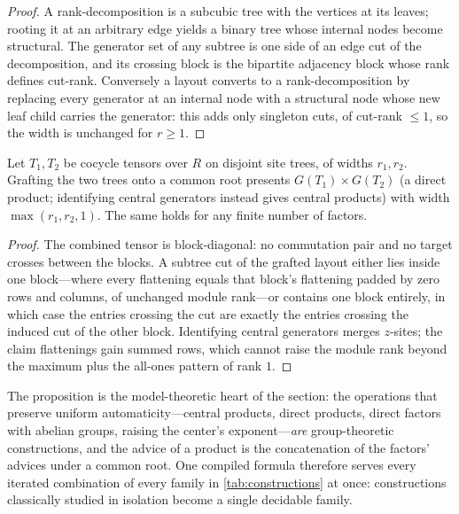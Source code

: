 \documentclass[a4paper,UKenglish,autoref,anonymous]{lipics-v2021}
\newcommand{\R}{R}                                   %
\begin{document}
\begin{proof}
A rank-decomposition is a subcubic tree with the vertices at its leaves;
rooting it at an arbitrary edge yields a binary tree whose internal
nodes become structural. The generator set of any subtree is one side of
an edge cut of the decomposition, and its crossing block is the
bipartite adjacency block whose rank defines cut-rank. Conversely a
layout converts to a rank-decomposition by replacing every generator at
an internal node with a structural node whose new leaf child carries the
generator: this adds only singleton cuts, of cut-rank $\le 1$, so the
width is unchanged for $r \ge 1$.
\end{proof}

\begin{proposition}
\label{prop:products}
Let $T_1, T_2$ be cocycle tensors over $\R$ on disjoint site trees, of
widths $r_1, r_2$. Grafting the two trees onto a common root presents
$G(T_1) \times G(T_2)$ (a direct product; identifying central generators
instead gives central products) with width $\max(r_1, r_2, 1)$. The
same holds for any finite number of factors.
\end{proposition}

\begin{proof}
The combined tensor is block-diagonal: no commutation pair and no
target crosses between the blocks. A subtree cut of the grafted layout
either lies inside one block---where every flattening equals that
block's flattening padded by zero rows and columns, of unchanged module
rank---or contains one block entirely, in which case the entries
crossing the cut are exactly the entries crossing the induced cut of the
other block. Identifying central generators merges $z$-sites; the claim
flattenings gain summed rows, which cannot raise the module rank beyond
the maximum plus the all-ones pattern of rank $1$.
\end{proof}

The proposition is the model-theoretic heart of the section: the
operations that preserve uniform automaticity---central products, direct
products, direct factors with abelian groups, raising the center's
exponent---\emph{are} group-theoretic constructions, and the advice of a
product is the concatenation of the factors' advices under a common
root. One compiled formula therefore serves every iterated combination
of every family in \autoref{tab:constructions} at once: constructions
classically studied in isolation become a single decidable family.
\end{document}
